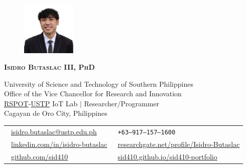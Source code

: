 \documentclass[letterpaper,11pt]{article}
\begin{document}
\begin{figure}
	\vspace{-20pt}
	\hfill\includegraphics[width=0.23\textwidth]{images/my-pic.png}
\end{figure}

{\LARGE \scshape \textbf{Isidro Butaslac III, PhD}} \\

\begin{adjustwidth}{0.3cm}{0cm}

	{University of Science and Technology of Southern Philippines} \\
	{Office of the Vice Chancellor for Research and Innovation} \\
	{\href{https://www.rspotsolutions.com/}{RSPOT}-\href{https://www.ustp.edu.ph/}{USTP} IoT Lab $|$ Researcher/Programmer} \\
	{Cagayan de Oro City, Philippines} \\

	\vspace{3pt}

	\begin{tabular}{@{} l l}
		{\faEnvelope\ \footnotesize\href{mailto:isidro.butaslac@ustp.edu.ph}{isidro.butaslac@ustp.edu.ph} }               &
		{\faPhone\ \footnotesize\texttt{+63--917--157--1600}}                                                                                                         \\

		{\faLinkedin\ \footnotesize\href{https://www.linkedin.com/in/isidro-butaslac/}{linkedin.com/in/isidro-butaslac} } &
		{\resizebox{4mm}{!}{{\faResearchgate}}\ \footnotesize\href{https://www.researchgate.net/profile/Isidro-Butaslac/}{researchgate.net/profile/Isidro-Butaslac} } \\

		{\faGithub\ \footnotesize\href{https://github.com/sid410}{github.com/sid410} }                                    &
		{\faBriefcase\ \footnotesize\href{https://sid410.github.io/sid410-portfolio/}{sid410.github.io/sid410-portfolio} }                                            \\
	\end{tabular}

\end{adjustwidth}
\end{document}
